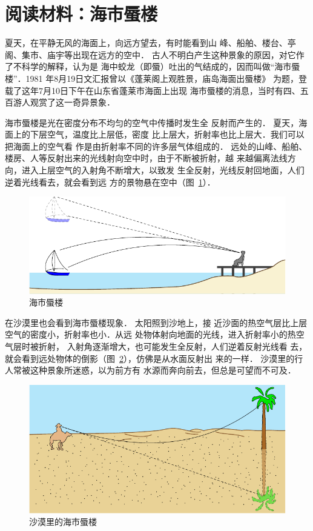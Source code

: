 \section*{阅读材料：海市蜃楼}

夏天，在平静无风的海面上，向远方望去，有时能看到山
峰、船舶、楼台、亭阁、集市、庙宇等出现在远方的空中．
古人不明白产生这种景象的原因，对它作了不科学的解释，认为是
海中蛟龙（即蜃）吐出的气结成的，因而叫做“海市蜃楼”．1981
年8月19日文汇报曾以《蓬莱阁上观胜景，庙岛海面出蜃楼》
为题，登载了这年7月10日下午在山东省蓬莱市海面上出现
海市蜃楼的消息，当时有四、五百游人观赏了这一奇异景象．

海市蜃楼是光在密度分布不均匀的空气中传播时发生全
反射而产生的．
夏天，海面上的下层空气，温度比上层低，密度
比上层大，折射率也比上层大．我们可以把海面上的空气看
作是由折射率不同的许多层气体组成的．
远处的山峰、船舶、
楼房、人等反射出来的光线射向空中时，由于不断被折射，越
来越偏离法线方向，进入上层空气的入射角不断增大，以致发
生全反射，光线反射回地面，人们逆着光线看去，就会看到远
方的景物悬在空中（图~\ref{fig_C_5-27}）．
\begin{figure}[htbp]
    \centering
    \includegraphics{fig/C/5-27.pdf}
    \caption{海市蜃楼}\label{fig_C_5-27}
\end{figure}

在沙漠里也会看到海市蜃楼现象．
太阳照到沙地上，接
近沙面的热空气层比上层空气的密度小，折射率也小．从远
处物体射向地面的光线，进入折射率小的热空气层时被折射，
入射角逐渐增大，也可能发生全反射，人们逆着反射光线看
去，就会看到远处物体的倒影（图~\ref{fig_C_5-28}），仿佛是从水面反射出
来的一样．
沙漠里的行人常被这种景象所迷惑，以为前方有
水源而奔向前去，但总是可望而不可及．
\begin{figure}[htbp]
    \centering
    \includegraphics{fig/C/5-28.pdf}
    \caption{沙漠里的海市蜃楼}\label{fig_C_5-28}
\end{figure}

